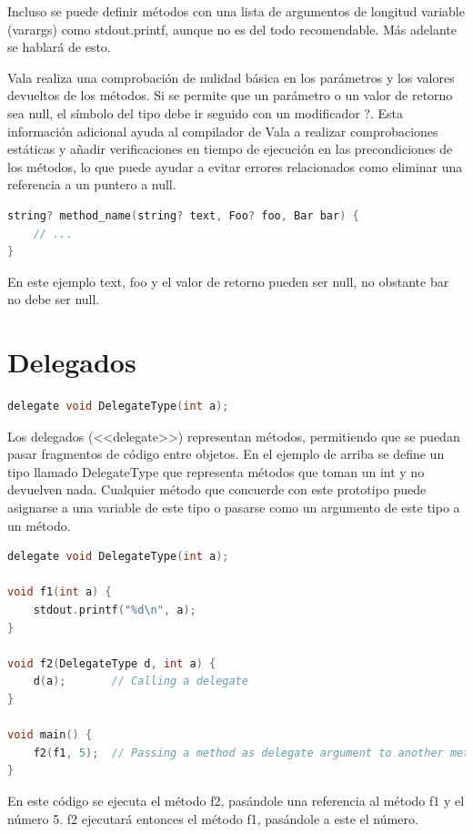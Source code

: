 \documentclass[12pt,twoside]{book}
\begin{document}
Incluso se puede definir métodos con una lista de argumentos de longitud variable (varargs) como stdout.printf, aunque no es del todo recomendable. Más adelante se hablará de esto.

Vala realiza una comprobación de nulidad básica en los parámetros y los valores devueltos de los métodos. Si se permite que un parámetro o un valor de retorno sea null, el símbolo del tipo debe ir seguido con un modificador ?. Esta información adicional ayuda al compilador de Vala a realizar comprobaciones estáticas y añadir verificaciones en tiempo de ejecución en las precondiciones de los métodos, lo que puede ayudar a evitar errores relacionados como eliminar una referencia a un puntero a null.

\begin{lstlisting}[language=C++]
string? method_name(string? text, Foo? foo, Bar bar) {
	// ...
}
\end{lstlisting}

En este ejemplo text, foo y el valor de retorno pueden ser null, no obstante bar no debe ser null.

\section{Delegados}

\begin{lstlisting}[language=C++]
delegate void DelegateType(int a);
\end{lstlisting}

Los delegados (<<delegate>>) representan métodos, permitiendo que se puedan pasar fragmentos de código entre objetos. En el ejemplo de arriba se define un tipo llamado DelegateType que representa métodos que toman un int y no devuelven nada. Cualquier método que concuerde con este prototipo puede asignarse a una variable de este tipo o pasarse como un argumento de este tipo a un método.
\begin{lstlisting}[language=C++]
delegate void DelegateType(int a);

void f1(int a) {
	stdout.printf("%d\n", a);
}

void f2(DelegateType d, int a) {
	d(a);       // Calling a delegate
}

void main() {
	f2(f1, 5);  // Passing a method as delegate argument to another method
}
\end{lstlisting}


En este código se ejecuta el método f2, pasándole una referencia al método f1 y el número 5. f2 ejecutará entonces el método f1, pasándole a este el número.
\end{document}
